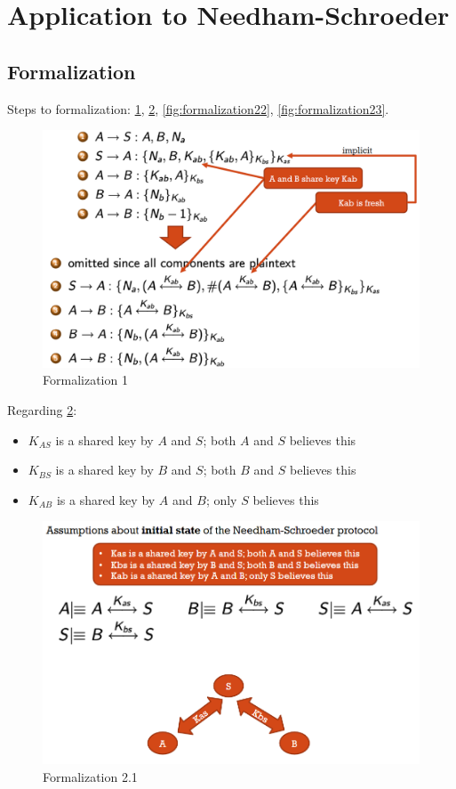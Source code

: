 \section{Application to Needham-Schroeder}
\subsection{Formalization}

Steps to formalization: \ref{fig:formalization1}, \ref{fig:formalization21}, \ref{fig:formalization22}, \ref{fig:formalization23}.
\begin{figure}
	\centering
	\includegraphics[width=0.7\linewidth]{Images/Chapter4/formalization1}
	\caption{Formalization 1}
	\label{fig:formalization1}
\end{figure}




Regarding \ref{fig:formalization21}:
\begin{itemize}
	\item $K_{AS}$ is a shared key by $A$ and $S$; both $A$ and $S$ believes this
	\item $K_{BS}$ is a shared key by $B$ and $S$; both $B$ and $S$ believes this
	\item $K_{AB}$ is a shared key by $A$ and $B$; only $S$ believes this
\end{itemize}

\begin{figure}
	\centering
	\includegraphics[width=0.7\linewidth]{Images/Chapter4/formalization21}
	\caption{Formalization 2.1}
	\label{fig:formalization21}
\end{figure}

